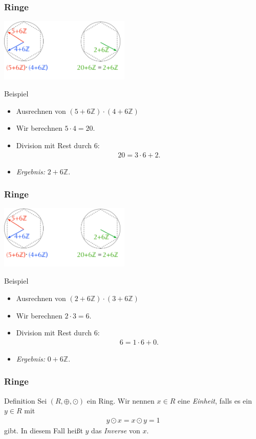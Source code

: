 \documentclass{beamer}
\renewcommand{\emph}[1]{{\textcolor{solarizedRed}{\itshape #1}}}
\newcommand\ZZ{\mathbb Z}
\renewcommand{\otimes}{\odot}
\begin{document}
\begin{frame}\frametitle{Ringe}
	\hfill\includegraphics[height=30mm]{pics/cyclicGroup3.pdf}
	\begin{block}{Beispiel}
	\begin{itemize}
		\item Ausrechnen von $(5+6\ZZ)\cdot(4+6\ZZ)$
		\item Wir berechnen $5\cdot 4=20$.
		\item Division mit Rest durch 6:
			\begin{align*}
			20=3\cdot 6+2.
			\end{align*}
		\item \emph{Ergebnis:} $2+6\ZZ$.
	\end{itemize}
	\end{block}
\end{frame}

\begin{frame}\frametitle{Ringe}
	\hfill\includegraphics[height=30mm]{pics/cyclicGroup3.pdf}
	\begin{block}{Beispiel}
	\begin{itemize}
		\item Ausrechnen von $(2+6\ZZ)\cdot(3+6\ZZ)$
		\item Wir berechnen $2\cdot 3=6$.
		\item Division mit Rest durch 6:
			\begin{align*}
			6=1\cdot 6+0.
			\end{align*}
		\item \emph{Ergebnis:} $0+6\ZZ$.
	\end{itemize}
	\end{block}
\end{frame}

\begin{frame}\frametitle{Ringe}
\begin{block}{Definition}
	Sei $(R,\oplus,\otimes)$ ein Ring.
	Wir nennen $x\in R$ eine \emph{Einheit}, falls es ein $y\in R$ mit
	\begin{align*}
	y\otimes x=x\otimes y=1
	\end{align*}
gibt.
In diesem Fall hei\ss t $y$ das \emph{Inverse} von $x$.
\end{block}
\end{frame}
\end{document}
